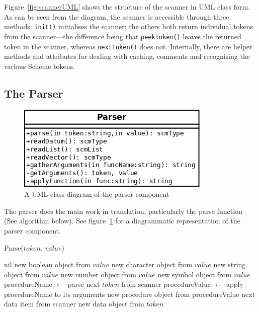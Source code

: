 Figure~\ref{fig:scannerUML} shows the structure of the scanner in UML class
form. As can be seen from the diagram, the scanner is accessible through three
methods: \texttt{init()} initialises the scanner; the others both return
individual tokens from the scanner---the difference being that
\texttt{peekToken()} leaves the returned token in the scanner, whereas
\texttt{nextToken()} does not. Internally, there are helper methods and
attributes for dealing with caching, comments and recognising the various Scheme
tokens.

\subsection{The Parser}

\begin{figure}
\centering
\includegraphics[width=\textwidth]{parserUML.png}
\caption{A UML class diagram of the parser component}
\label{fig:parserUML}
\end{figure}

The parser does the main work in translation, particularly the parse function
(See algorithm below).
See figure~\ref{fig:parserUML} for a diagrammatic representation of the parser
component.

\begin{algorithm}
\caption{Parse($token$, $value$)}
\label{alg:parse}
\begin{algorithmic}
\RETURN nil
\RETURN new boolean object from $value$
\RETURN new character object from $value$
\RETURN new string object from $value$
\RETURN new number object from $value$
\RETURN new symbol object from $value$
\ELSIF{$token$ = $($ or $token$ = $[$}
\STATE procedureName $\leftarrow$ parse next $token$ from scanner
\STATE procedureValue $\leftarrow$ apply procedureName to its arguments
\RETURN new procedure object from procedureValue
\RETURN next data item from scanner
\ELSE
\RETURN new data object from $token$
\ENDIF
\end{algorithmic}
\end{algorithm}

